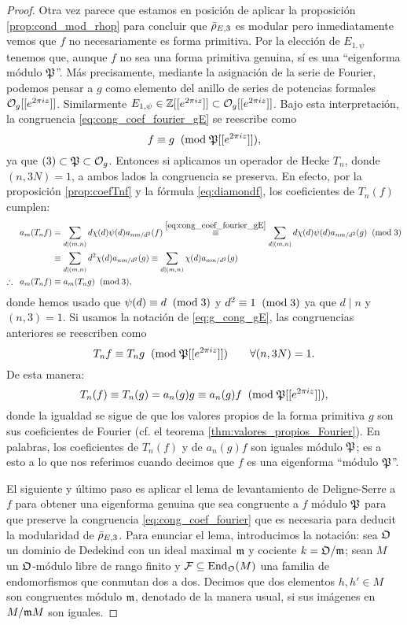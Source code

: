 \begin{proof}
  Otra vez parece que estamos en posici\'on de aplicar la proposici\'on \ref{prop:cond_mod_rhop} para concluir que $\bar{\rho}_{E,3}$ es modular pero inmediatamente vemos que $f$ no necesariamente es forma primitiva. Por la elecci\'on de $E_{1,\psi}$ tenemos que, aunque $f$ no sea una forma primitiva genuina, s\'i es una ``eigenforma m\'odulo $\mathfrak{P}$''. M\'as precisamente, mediante la asignaci\'on de la serie de Fourier, podemos pensar a $g$ como elemento del anillo de series de potencias formales $\mathcal{O}_g[[e^{2\pi iz}]]$. Similarmente $E_{1,\psi}\in\mathbb{Z}[[e^{2\pi iz}]]\subset\mathcal{O}_g[[e^{2\pi iz}]]$. Bajo esta interpretaci\'on, la congruencia \eqref{eq:cong_coef_fourier_gE} se reescribe como
  \begin{equation}\label{eq:g_cong_gE}
    f\equiv g \;\;(\mathrm{mod}\; \mathfrak{P}[[e^{2\pi iz}]]),
  \end{equation}
  ya que $(3)\subset\mathfrak{P}\subset\mathcal{O}_g$. Entonces si aplicamos un operador de Hecke $T_n$, donde $(n,3N)=1$, a ambos lados la congruencia se preserva. En efecto, por la proposici\'on \ref{prop:coefTnf} y la f\'ormula \ref{eq:diamondf}, los coeficientes de $T_n(f)$ cumplen:
  \begin{align*}
    a_m(T_nf)
    &=\sum_{d\mid (m,n)}d \chi(d)\psi(d)a_{nm/d^2}(f)\overset{\eqref{eq:cong_coef_fourier_gE}}{\equiv}\sum_{d\mid (m,n)}d \chi(d)\psi(d)a_{nm/d^2}(g)\;\;(\mathrm{mod}\; 3)\\
    &\equiv \sum_{d\mid (m,n)}d^2 \chi(d) a_{nm/d^2}(g)\equiv\sum_{d\mid (m,n)}\chi(d) a_{nm/d^2}(g)\\
    \therefore\;\; a_m(T_nf)
    &\equiv a_m(T_ng)\;\;(\mathrm{mod}\; 3),
  \end{align*}
  donde hemos usado que $\psi(d)\equiv d\;\;(\mathrm{mod}\; 3)$ y $d^2\equiv1\;\;(\mathrm{mod}\; 3)$ ya que $d\mid n$ y $(n,3)=1$. Si usamos la notaci\'on de \eqref{eq:g_cong_gE}, las congruencias anteriores se reescriben como
  \[
    T_nf\equiv T_ng \;\;(\mathrm{mod}\; \mathfrak{P}[[e^{2\pi iz}]])\qquad\forall(n,3N)=1.
  \]
  De esta manera: 
  \[
    T_n(f)\equiv T_n(g)=a_n(g)g\equiv a_n(g)f\;\;(\mathrm{mod}\; \mathfrak{P}[[e^{2\pi iz}]]),
  \]
  donde la igualdad se sigue de que los valores propios de la forma primitiva $g$ son sus coeficientes de Fourier (cf. el teorema \ref{thm:valores_propios_Fourier}). En palabras, los coeficientes de $T_n(f)$ y de $a_n(g)f$ son iguales módulo $\mathfrak{P}$; es a esto a lo que nos referimos cuando decimos que $f$ es una eigenforma ``m\'odulo $\mathfrak{P}$''.
 
  
  El siguiente y \'ultimo paso es aplicar el lema de levantamiento de Deligne-Serre a $f$ para obtener una eigenforma genuina que sea congruente a $f$ m\'odulo $\mathfrak{P}$ para que preserve la congruencia \eqref{eq:cong_coef_fourier} que es necesaria para deducit la modularidad de $\bar{\rho}_{E,3}$. Para enunciar el lema, introducimos la notaci\'on: sea $\mathfrak{O}$ un dominio de Dedekind con un ideal maximal $\mathfrak{m}$ y cociente $k=\mathfrak{O}/\mathfrak{m}$; sean $M$ un $\mathfrak{O}$-m\'odulo libre de rango finito y $\mathcal{F}\subseteq\mathrm{End}_{\mathfrak{O}}(M)$ una familia de endomorfismos que conmutan dos a dos. Decimos que dos elementos $h,h'\in M$ son congruentes m\'odulo $\mathfrak{m}$, denotado de la manera usual, si sus im\'agenes en $M/\mathfrak{m} M$ son iguales.


\end{proof}

